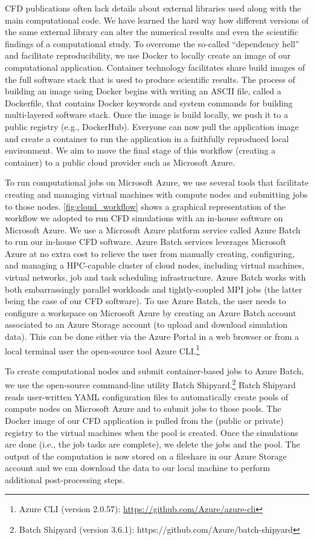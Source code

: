 \documentclass[10pt,journal,compsoc]{IEEEtran}
\begin{document}
CFD publications often lack details about external libraries used along with the main computational code.
We have learned the hard way how different versions of the same external library can alter the numerical results and even the scientific findings of a computational study\cite{mesnard_barba_2017}.
To overcome the so-called ``dependency hell'' and facilitate reproducibility, we use Docker to locally create an image of our computational application.
Container technology facilitates share build images of the full software stack that is used to produce scientific results.
The process of building an image using Docker begins with writing an ASCII file, called a Dockerfile, that contains Docker keywords and system commands for building multi-layered software stack.
Once the image is build locally, we push it to a public registry (e.g., DockerHub).
Everyone can now pull the application image and create a container to run the application in a faithfully reproduced local environment.
We aim to move the final stage of this workflow (creating a container) to a public cloud provider such as Microsoft Azure.

To run computational jobs on Microsoft Azure, we use several tools that facilitate creating and managing virtual machines with compute nodes and submitting jobs to those nodes.
\ref{fig:cloud_workflow} shows a graphical representation of the workflow we adopted to run CFD simulations with an in-house software on Microsoft Azure.
We use a Microsoft Azure platform service called Azure Batch to run our in-house CFD software.
Azure Batch services leverages Microsoft Azure at no extra cost to relieve the user from manually creating, configuring, and managing a HPC-capable cluster of cloud nodes, including virtual machines, virtual networks, job and task scheduling infrastructure.
Azure Batch works with both embarrassingly parallel workloads and tightly-coupled MPI jobs (the latter being the case of our CFD software).
To use Azure Batch, the user needs to configure a workspace on Microsoft Azure by creating an Azure Batch account associated to an Azure Storage account (to upload and download simulation data).
This can be done either via the Azure Portal in a web browser or from a local terminal user the open-source tool Azure CLI.\footnote{Azure CLI (version 2.0.57): \url{https://github.com/Azure/azure-cli}}

To create computational nodes and submit container-based jobs to Azure Batch, we use the open-source command-line utility Batch Shipyard.\footnote{Batch Shipyard (version 3.6.1): https://github.com/Azure/batch-shipyard} Batch Shipyard reads user-written YAML configuration files to automatically create pools of compute nodes on Microsoft Azure and to submit jobs to those pools.
The Docker image of our CFD application is pulled from the (public or private) registry to the virtual machines when the pool is created.
Once the simulations are done (i.e., the job tasks are complete), we delete the jobs and the pool.
The output of the computation is now stored on a fileshare in our Azure Storage account and we can download the data to our local machine to perform additional post-processing steps.
\end{document}

